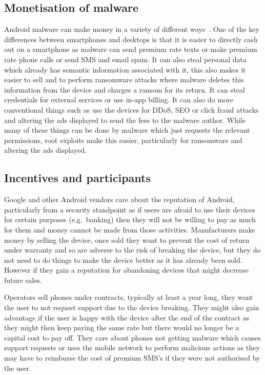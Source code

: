 \documentclass[conference,a4paper,twoside]{IEEEtran}
\begin{document}
\subsection{Monetisation of malware}
Android malware can make money in a variety of different ways~\cite{Felt2011}.
One of the key differences between smartphones and desktops is that it is easier to directly cash out on a smartphone as malware can send premium rate texts or make premium rate phone calls or send SMS and email spam.
It can also steal personal data which already has semantic information associated with it, this also makes it easier to sell and to perform ransomware attacks where malware deletes this information from the device and charges a ransom for its return.
It can steal credentials for external services or use in-app billing.
It can also do more conventional things such as use the devices for DDoS, SEO or click fraud attacks and altering the ads displayed to send the fees to the malware author.
While many of these things can be done by malware which just requests the relevant permissions, root exploits make this easier, particularly for ransomware and altering the ads displayed.

\subsection{Incentives and participants}
\label{sec:economics}
Google and other Android vendors care about the reputation of Android, particularly from a security standpoint as if users are afraid to use their devices for certain purposes (e.g.\ banking) then they will not be willing to pay as much for them and money cannot be made from those activities.
Manufacturers make money by selling the device, once sold they want to prevent the cost of return under warranty and so are adverse to the risk of breaking the device, but they do not need to do things to make the device better as it has already been sold.
However if they gain a reputation for abandoning devices that might decrease future sales.

Operators sell phones under contracts, typically at least a year long, they want the user to not request support due to the device breaking.
They might also gain advantage if the user is happy with the device after the end of the contract as they might then keep paying the same rate but there would no longer be a capital cost to pay off.
They care about phones not getting malware which causes support requests or uses the mobile network to perform malicious actions as they may have to reimburse the cost of premium SMS's if they were not authorised by the user.
\end{document}
